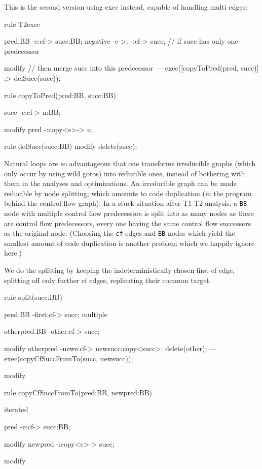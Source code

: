 This is the second version using exec instead, capable of handling multi edges:

  \begin{example}
    \begin{grgen}
rule T2exec
{
  pred:BB -e:cf-> succ:BB;
  negative {
    -e->;
    -:cf-> succ; // if succ has only one predecessor
  }

  modify { // then merge succ into this predecessor
  ---
    exec([copyToPred(pred, succ)] ;> delSucc(succ));
  }
}

rule copyToPred(pred:BB, succ:BB)
{
  succ -e:cf-> n:BB;

  modify {
    pred -:copy<e>-> n;
  }
}

rule delSucc(succ:BB)
{
  modify {
    delete(succ);
  }
}
    \end{grgen}
  \end{example}

Natural loops are so advantageous that one transforms irreducible graphs (which only occur by using wild gotos) into reducible ones, instead of bothering with them in the analyses and optimizations.
An irreducible graph can be made reducible by node splitting, which amounts to code duplication (in the program behind the control flow graph).
In a stuck situation after T1-T2 analysis, a \texttt{BB} node with multiple control flow predecessors is split into as many nodes as there are control flow predecessors, every one having the same control flow successors as the original node.
(Choosing the \texttt{cf} edges and \texttt{BB} nodes which yield the smallest amount of code duplication is another problem which we happily ignore here.)

  \begin{example}
We do the splitting by keeping the indeterministically chosen first cf edge, splitting off only further cf edges, replicating their common target.

    \begin{grgen}
rule split(succ:BB)
{
  pred:BB -first:cf-> succ;
  multiple {
    otherpred:BB -other:cf-> succ;

    modify {
      otherpred -newe:cf-> newsucc:copy<succ>;
      delete(other);
    ---
      exec(copyCfSuccFromTo(succ, newsucc));
    }
  }

  modify {
  }
}

rule copyCfSuccFromTo(pred:BB, newpred:BB)
{
  iterated {
    pred -e:cf-> succ:BB;

    modify {
      newpred -:copy<e>-> succ;
    }
  }

  modify {
  }
}
    \end{grgen}
  \end{example}


